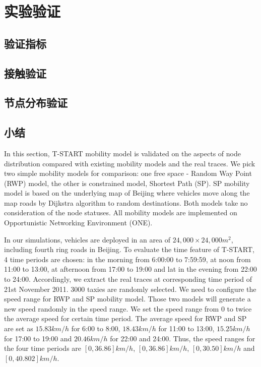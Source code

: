 \chapter{实验验证}


\section{验证指标}
\section{接触验证}
\section{节点分布验证}
\section{小结}

In this section, T-START mobility model is validated on the aspects of node distribution compared with existing mobility models and the real traces. We pick two simple mobility models for comparison: one free space - Random Way Point (RWP) model, the other is constrained model, Shortest Path (SP).  SP mobility model is based on the underlying map of Beijing where vehicles move along the map roads by Dijkstra algorithm to random destinations. Both models take no consideration of the node statuses. All mobility models are implemented on Opportunistic Networking Environment (ONE)\cite{KeranenOtt-155}.

In our simulations, vehicles are deployed in an area of $24,000\times 24,000 m^2$, including fourth ring roads in Beijing.
To evaluate the time feature of T-START, 4 time periods are chosen: in the morning from 6:00:00 to 7:59:59, at noon from 11:00 to 13:00, at afternoon from 17:00 to 19:00 and lat in the evening from 22:00 to 24:00. Accordingly, we extract the real traces at corresponding time period of 21st November 2011.
3000 taxies are randomly selected. 
We need to configure the speed range for RWP and SP mobility model. Those two models will generate a new speed randomly in the speed range. We set the speed range from 0 to twice the average speed for certain time period.
The average speed for RWP and SP are set as $15.83km/h$ for 6:00 to 8:00, $18.43km/h$ for 11:00 to 13:00, $15.25km/h$ for 17:00 to 19:00 and $20.46km/h$ for 22:00 and 24:00. 
Thus, the speed ranges for the four time periods are $[0, 36.86]km/h$, $[0, 36.86]km/h$, $[0, 30.50]km/h$ and $[0, 40.802]km/h$.

